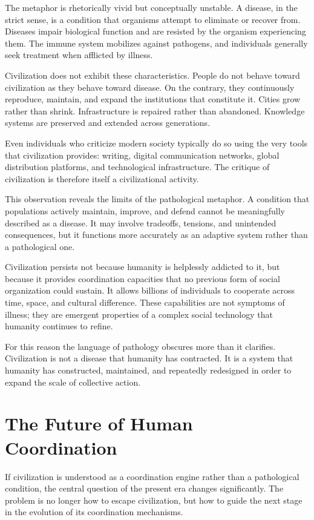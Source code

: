 \documentclass[12pt]{article}
\begin{document}
The metaphor is rhetorically vivid but conceptually unstable. A disease, in the strict sense, is a condition that organisms attempt to eliminate or recover from. Diseases impair biological function and are resisted by the organism experiencing them. The immune system mobilizes against pathogens, and individuals generally seek treatment when afflicted by illness.

Civilization does not exhibit these characteristics. People do not behave toward civilization as they behave toward disease. On the contrary, they continuously reproduce, maintain, and expand the institutions that constitute it. Cities grow rather than shrink. Infrastructure is repaired rather than abandoned. Knowledge systems are preserved and extended across generations.

Even individuals who criticize modern society typically do so using the very tools that civilization provides: writing, digital communication networks, global distribution platforms, and technological infrastructure. The critique of civilization is therefore itself a civilizational activity.

This observation reveals the limits of the pathological metaphor. A condition that populations actively maintain, improve, and defend cannot be meaningfully described as a disease. It may involve tradeoffs, tensions, and unintended consequences, but it functions more accurately as an adaptive system rather than a pathological one.

Civilization persists not because humanity is helplessly addicted to it, but because it provides coordination capacities that no previous form of social organization could sustain. It allows billions of individuals to cooperate across time, space, and cultural difference. These capabilities are not symptoms of illness; they are emergent properties of a complex social technology that humanity continues to refine.

For this reason the language of pathology obscures more than it clarifies. Civilization is not a disease that humanity has contracted. It is a system that humanity has constructed, maintained, and repeatedly redesigned in order to expand the scale of collective action.

\section{The Future of Human Coordination}

If civilization is understood as a coordination engine rather than a pathological condition, the central question of the present era changes significantly. The problem is no longer how to escape civilization, but how to guide the next stage in the evolution of its coordination mechanisms.
\end{document}
